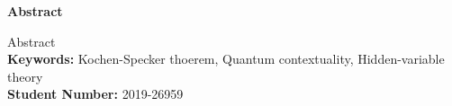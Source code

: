 \thispagestyle{plain}
\begin{center}
    \Large
    \textbf{Abstract}
\end{center}

Abstract\\

\textbf{Keywords:} Kochen-Specker thoerem, Quantum contextuality, Hidden-variable theory \\

\textbf{Student Number:} 2019-26959
